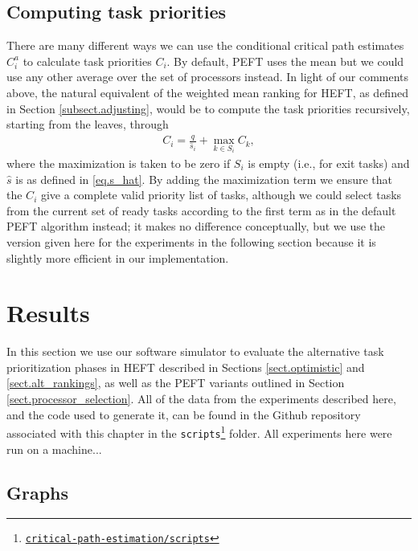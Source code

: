 \documentclass[12pt]{article}
\begin{document}
\subsection{Computing task priorities}
\label{subsect.ps_priorities}

There are many different ways we can use the conditional critical path estimates $C_i^a$ to calculate task priorities $C_i$. By default, PEFT uses the mean but we could use any other average over the set of processors instead. In light of our comments above, the natural equivalent of the weighted mean ranking for HEFT, as defined in Section \ref{subsect.adjusting}, would be to compute the task priorities recursively, starting from the leaves, through 
\begin{align}
C_i = \frac{q}{\hat{s}_i} + \max_{k \in S_i} C_k, \label{eq.alt_prios}
\end{align}  
where the maximization is taken to be zero if $S_i$ is empty (i.e., for exit tasks) and $\hat{s}$ is as defined in \eqref{eq.s_hat}. By adding the maximization term we ensure that the $C_i$ give a complete valid priority list of tasks, although we could select tasks from the current set of ready tasks according to the first term as in the default PEFT algorithm instead; it makes no difference conceptually, but we use the version given here for the experiments in the following section because it is slightly more efficient in our implementation.

\section{Results}
\label{sect.results}

In this section we use our software simulator to evaluate the alternative task prioritization phases in HEFT described in Sections \ref{sect.optimistic} and \ref{sect.alt_rankings}, as well as the PEFT variants outlined in Section \ref{sect.processor_selection}. All of the data from the experiments described here, and the code used to generate it, can be found in the Github repository associated with this chapter in the {\tt scripts}\footnote{\href{https://github.com/mcsweeney90/critical-path-estimation}{{\tt \small critical-path-estimation/scripts}}} folder. All experiments here were run on a machine...

\subsection{Graphs}
\label{subsect.graphs}
\end{document}
